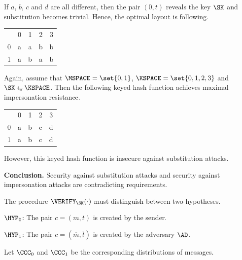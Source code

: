 \documentclass[landscape,footrule]{foils}
\begin{document}
If $a$, $b$, $c$ and $d$ are all different, then the pair $(0,t)$
reveals the key $\SK$ and substitution becomes trivial. Hence, the
optimal layout is following.
\begin{center}
  \begin{tabular}{c|c|c|c|c|}
   \multicolumn{1}{c}{  }
   &\multicolumn{1}{c}{0}
   &\multicolumn{1}{c}{1}
   &\multicolumn{1}{c}{2}
   &\multicolumn{1}{c}{3}\\
   \cline{2-5}
    0 & a & a & b & b\\
   \cline{2-5}
    1 & a & b & a & b\\
   \cline{2-5}
  \end{tabular}
\end{center}





Again, assume that $\MSPACE=\set{0,1}$, $\KSPACE=\set{0,1,2,3}$ and
$\SK\getsu\KSPACE$. Then the following keyed hash function achieves
maximal impersonation resistance.
\begin{center}
  \begin{tabular}{c|c|c|c|c|}
   \multicolumn{1}{c}{  }
   &\multicolumn{1}{c}{0}
   &\multicolumn{1}{c}{1}
   &\multicolumn{1}{c}{2}
   &\multicolumn{1}{c}{3}\\
   \cline{2-5}
    0 & a & b & c & d\\
   \cline{2-5}
    1 & a & b & c & d\\
   \cline{2-5}
  \end{tabular}
\end{center}
However, this keyed hash function is insecure against substitution
attacks.\vspace*{1cm}

\textbf{Conclusion.} Security against substitution attacks and
security against impersonation attacks are contradicting requirements.




The procedure $\VERIFY_\SK(\cdot)$ must distinguish between two hypotheses.
\begin{diamonds}
  \item[]$\HYP_0$: The pair $c=(m,t)$ is created by the sender.
  \item[]$\HYP_1$: The pair $c=(\overline{m},\overline{t})$ is created
    by the adversary $\AD$.
\end{diamonds}\vspace*{0ex}
Let $\CCC_0$ and $\CCC_1$ be the corresponding distributions of messages.
\end{document}

